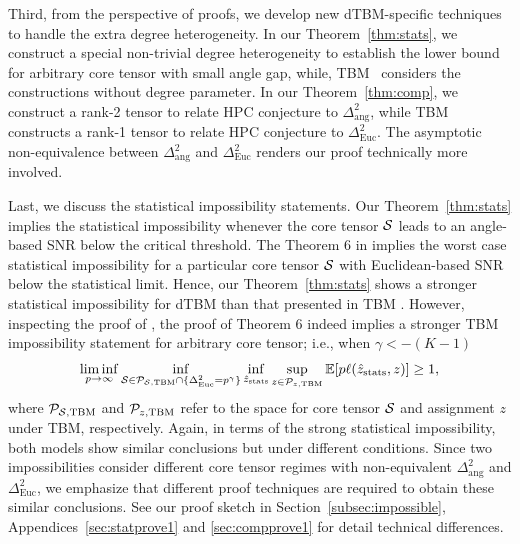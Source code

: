 \documentclass[journal]{IEEEtran}
\theoremstyle{definition}
\theoremstyle{definition}
\begin{document}
\begin{itemize}[wide]
 Third, from the perspective of proofs, we develop new dTBM-specific techniques to handle the extra degree heterogeneity. In our Theorem~\ref{thm:stats}, we construct a special non-trivial degree heterogeneity to establish the lower bound for arbitrary core tensor with small angle gap, while, TBM~\citep{han2020exact} considers the constructions without degree parameter.
In our Theorem~\ref{thm:comp}, we construct a rank-2 tensor to relate HPC conjecture to $\Delta^2_{\text{ang}}$, while TBM~\citep{han2020exact} constructs a rank-1 tensor to relate HPC conjecture to $\Delta^2_{\text{Euc}}$. The asymptotic non-equivalence between $\Delta^2_{\text{ang}}$ and $\Delta^2_{\text{Euc}}$ renders our proof technically more involved.
 
 Last, we discuss the statistical impossibility statements. Our Theorem~\ref{thm:stats} implies the statistical impossibility whenever the core tensor $\mathcal{S}$ leads to an angle-based SNR below the critical threshold. The Theorem 6 in \cite{han2020exact} implies the worst case statistical impossibility for a particular core tensor $\mathcal{S}$ with Euclidean-based SNR below the statistical limit. Hence, our Theorem~\ref{thm:stats} shows a stronger statistical impossibility for dTBM than that presented in TBM \cite[Theorem 6]{han2020exact}. However, inspecting the proof of \cite{han2020exact}, the proof of Theorem 6 indeed implies a stronger TBM impossibility statement for arbitrary core tensor; i.e., when $\gamma < -(K-1)$
 \small
 \begin{equation}
     \liminf_{p \rightarrow \infty} \inf_{ \mathcal{S} \in \mathcal{P}_{\mathcal{S}, {\rm TBM}} \cap \{\Delta_{\rm Euc}^2 = p^{\gamma} \} }\inf_{\hat z_{\rm stats}}  \sup_{z \in \mathcal{P}_{z, {\rm TBM}}}  \mathbb{E}[p \ell(\hat z_{\rm stats}, z)] \geq 1,
 \end{equation}
 \normalsize
 where $\mathcal{P}_{\mathcal{S}, {\rm TBM}}$ and $\mathcal{P}_{z, {\rm TBM}}$ refer to the space for core tensor $\mathcal{S}$ and assignment $z$ under TBM, respectively. Again, in terms of the strong statistical impossibility, both models show similar conclusions but under different conditions. Since two impossibilities consider different core tensor regimes with non-equivalent $\Delta^2_{\text{ang}}$ and $\Delta^2_{\text{Euc}}$, we emphasize that different proof techniques are required to obtain these similar conclusions. See our proof sketch in Section~\ref{subsec:impossible}, Appendices~\ref{sec:statprove1} and \ref{sec:compprove1} for detail technical differences.


\end{itemize}
\end{document}
